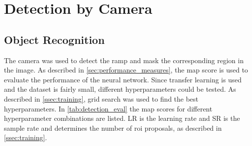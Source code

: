 \section{Detection by Camera}
\label{sec:eval_camera}
\subsection{Object Recognition}
The camera was used to detect the ramp and mask the corresponding region in the image.
As described in \cref{sec:performance_measures}, the \gls{map} score is used to evaluate the performance of the neural network.
Since transfer learning is used and the dataset is fairly small, different hyperparameters could be tested.
As described in \cref{ssec:training}, grid search was used to find the best hyperparameters.
In \cref{tab:detection_eval} the \gls{map} scores for different hyperparameter combinations are listed.
LR is the learning rate and SR is the sample rate and determines the number of \gls{roi} proposals, as described in \cref{ssec:training}.

